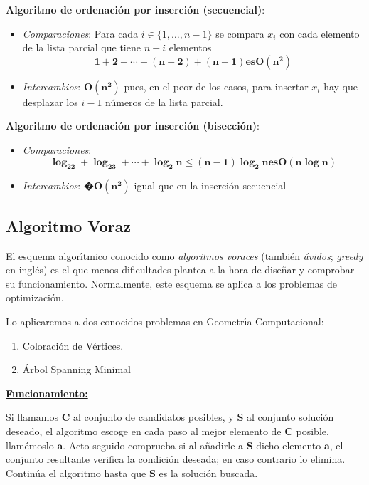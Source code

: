 \documentclass[ebook,oneside]{memoir}
\newcommand{\bolds}[1]{\boldsymbol{#1}}
\begin{document}
 \noindent\textbf{Algoritmo de ordenaci\'{o}n por inserci\'{o}n (secuencial)}:
    \begin{itemize}
       \item \emph{Comparaciones}: Para cada $i\in \{1,\ldots, n-1\}$ se compara $x_i$ con cada elemento de la lista parcial que tiene $n-i$ elementos $$\bolds{1+2+\cdots +(n-2)+(n-1) \mbox{es} O(n^2)}$$

       \item \emph{Intercambios}: $\bolds{O(n^2)}$ pues, en el peor de los casos, para insertar $x_i$ hay que desplazar los $i-1$ n\'{u}meros de la lista parcial.
    \end{itemize}


 \noindent\textbf{Algoritmo de ordenaci\'{o}n por inserci\'{o}n (bisecci\'{o}n)}:
    \begin{itemize}
        \item \emph{Comparaciones}: $$\bolds{\log_22+\log_23+\cdots+\log_2n\leq (n-1)\log_2n \mbox{es} O(n\log n)}$$
        \item \emph{Intercambios}: $\bolds{�O(n^2)}$ igual que en la inserci\'{o}n secuencial
    \end{itemize}


\subsection{Algoritmo Voraz}

El esquema algor\'{\i}tmico conocido como \emph{algoritmos voraces} (tambi\'{e}n \emph{\'{a}vidos}; \emph{greedy} en ingl\'{e}s) es el que menos dificultades plantea a la hora de dise\~{n}ar y comprobar su funcionamiento. Normalmente, este esquema se aplica a los problemas de optimizaci\'{o}n.
\vspace{0.2cm}

Lo aplicaremos a dos conocidos problemas en Geometr\'{\i}a Computacional:
        \begin{enumerate}
            \item Coloraci\'{o}n de V\'{e}rtices.
            \item \'{A}rbol Spanning Minimal
        \end{enumerate}

\noindent\underline{\textbf{Funcionamiento:}}
\vspace{0.2cm}

Si llamamos $\bolds{C}$ al conjunto de candidatos posibles, y $\bolds{S}$ al conjunto soluci\'{o}n deseado, el algoritmo escoge en cada paso al mejor
elemento de $\bolds{C}$ posible, llam\'{e}moslo $\bolds{a}$. Acto seguido comprueba si al a\~{n}adirle a $\bolds{S}$ dicho elemento $\bolds{a}$, el conjunto
resultante verifica la condici\'{o}n deseada; en caso contrario lo elimina. Contin\'{u}a el algoritmo hasta que $\bolds{S}$ es la soluci\'{o}n buscada.
\end{document}
